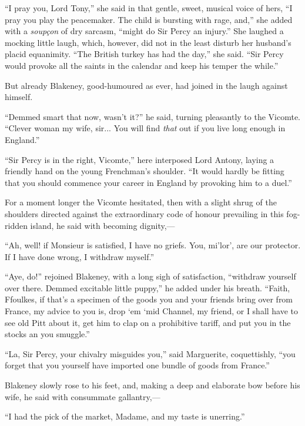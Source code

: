 \documentclass[paper=5.5in:8.5in,BCOR=7mm,twoside,DIV=calc,12pt,usegeometry,chapterprefix,endperiod,headings=big]{scrbook}
\begin{document}
\enquote{I pray you, Lord Tony,} she said in that gentle, sweet, musical voice of hers, \enquote{I pray you play the peacemaker. The child is bursting with rage, and,} she added with a \textit{soupçon} of dry sarcasm, \enquote{might do Sir Percy an injury.} She laughed a mocking little laugh, which, however, did not in the least disturb her husband's placid equanimity. \enquote{The British turkey has had the day,} she said. \enquote{Sir Percy would provoke all the saints in the calendar and keep his temper the while.}

But already Blakeney, good-humoured as ever, had joined in the laugh against himself.

\enquote{Demmed smart that now, wasn't it?} he said, turning pleasantly to the Vicomte. \enquote{Clever woman my wife, sir... You will find \textit{that} out if you live long enough in England.}

\enquote{Sir Percy is in the right, Vicomte,} here interposed Lord Antony, laying a friendly hand on the young Frenchman's shoulder. \enquote{It would hardly be fitting that you should commence your career in England by provoking him to a duel.}

For a moment longer the Vicomte hesitated, then with a slight shrug of the shoulders directed against the extraordinary code of honour prevailing in this fog-ridden island, he said with becoming dignity,---

\enquote{Ah, well! if Monsieur is satisfied, I have no griefs. You, mi'lor’, are our protector. If I have done wrong, I withdraw myself.}

\enquote{Aye, do!} rejoined Blakeney, with a long sigh of satisfaction, \enquote{withdraw yourself over there. Demmed excitable little puppy,} he added under his breath. \enquote{Faith, Ffoulkes, if that's a specimen of the goods you and your friends bring over from France, my advice to you is, drop `em `mid Channel, my friend, or I shall have to see old Pitt about it, get him to clap on a prohibitive tariff, and put you in the stocks an you smuggle.}

\enquote{La, Sir Percy, your chivalry misguides you,} said Marguerite, coquettishly, \enquote{you forget that you yourself have imported one bundle of goods from France.}

Blakeney slowly rose to his feet, and, making a deep and elaborate bow before his wife, he said with consummate gallantry,---

\enquote{I had the pick of the market, Madame, and my taste is unerring.}
\end{document}
